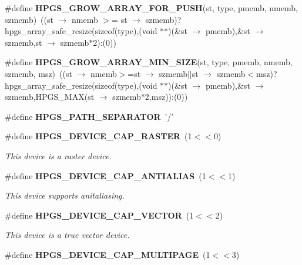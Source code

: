 \begin{CompactItemize}
\item 
\#define \textbf{HPGS\_\-GROW\_\-ARRAY\_\-FOR\_\-PUSH}(st, type, pmemb, nmemb, szmemb)~((st $\rightarrow$ nmemb $>$= st $\rightarrow$ szmemb)?hpgs\_\-array\_\-safe\_\-resize(sizeof(type),(void $\ast$$\ast$)(\&st $\rightarrow$ pmemb),\&st $\rightarrow$ szmemb,st $\rightarrow$ szmemb$\ast$2):(0))\label{group__base_g517e12a0413b50a105931b08e38750cc}

\item 
\#define \textbf{HPGS\_\-GROW\_\-ARRAY\_\-MIN\_\-SIZE}(st, type, pmemb, nmemb, szmemb, msz)~((st $\rightarrow$ nmemb$>$=st $\rightarrow$ szmemb$|$$|$st $\rightarrow$ szmemb$<$msz)?hpgs\_\-array\_\-safe\_\-resize(sizeof(type),(void $\ast$$\ast$)(\&st $\rightarrow$ pmemb),\&st $\rightarrow$ szmemb,HPGS\_\-MAX(st $\rightarrow$ szmemb$\ast$2,msz)):(0))\label{group__base_g3d54bf84dedc8374eab4ff3d4f08cd97}

\item 
\#define \textbf{HPGS\_\-PATH\_\-SEPARATOR}~'/'\label{group__base_g844e792efbe234c04b5ecd4b23d5db9b}

\item 
\#define {\bf HPGS\_\-DEVICE\_\-CAP\_\-RASTER}~(1$<$$<$0)\label{group__device_g8175e4398fb6e52394c50e931f8cf693}

\begin{CompactList}\small\item\em This device is a raster device. \item\end{CompactList}\item 
\#define {\bf HPGS\_\-DEVICE\_\-CAP\_\-ANTIALIAS}~(1$<$$<$1)\label{group__device_gbfbaca61af5c0e6faef1ad7a562f3329}

\begin{CompactList}\small\item\em This device supports anitaliasing. \item\end{CompactList}\item 
\#define {\bf HPGS\_\-DEVICE\_\-CAP\_\-VECTOR}~(1$<$$<$2)\label{group__device_g83df9d5e409b8b6c76d218cac0a6e0a1}

\begin{CompactList}\small\item\em This device is a true vector device. \item\end{CompactList}\item 
\#define {\bf HPGS\_\-DEVICE\_\-CAP\_\-MULTIPAGE}~(1$<$$<$3)\label{group__device_ge56cf76d457f9ee8dd758b10d6bd10e5}


\end{CompactItemize}
